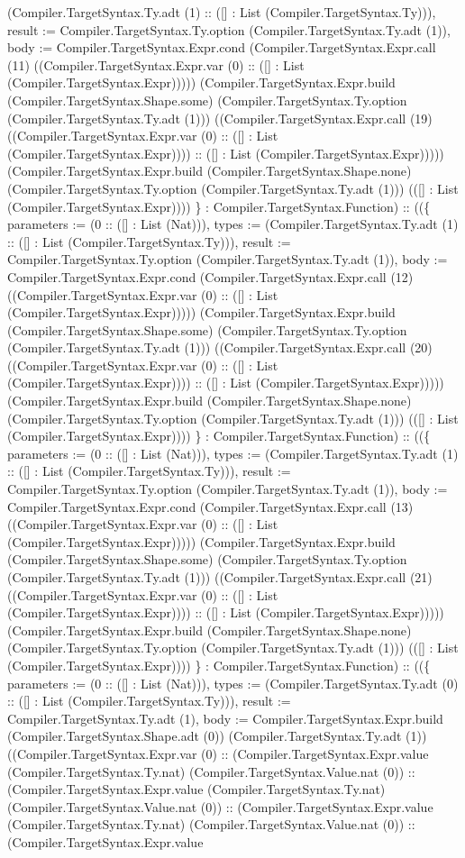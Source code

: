 \documentclass[11pt]{article}
\begin{document}
(Compiler.TargetSyntax.Ty.adt (1) :: ([] : List (Compiler.TargetSyntax.Ty))), result := Compiler.TargetSyntax.Ty.option (Compiler.TargetSyntax.Ty.adt (1)), body := Compiler.TargetSyntax.Expr.cond (Compiler.TargetSyntax.Expr.call (11) ((Compiler.TargetSyntax.Expr.var (0) :: ([] : List (Compiler.TargetSyntax.Expr))))) (Compiler.TargetSyntax.Expr.build (Compiler.TargetSyntax.Shape.some) (Compiler.TargetSyntax.Ty.option (Compiler.TargetSyntax.Ty.adt (1))) ((Compiler.TargetSyntax.Expr.call (19) ((Compiler.TargetSyntax.Expr.var (0) :: ([] : List (Compiler.TargetSyntax.Expr)))) :: ([] : List (Compiler.TargetSyntax.Expr))))) (Compiler.TargetSyntax.Expr.build (Compiler.TargetSyntax.Shape.none) (Compiler.TargetSyntax.Ty.option (Compiler.TargetSyntax.Ty.adt (1))) (([] : List (Compiler.TargetSyntax.Expr)))) \} : Compiler.TargetSyntax.Function) :: ((\{ parameters := (0 :: ([] : List (Nat))), types := (Compiler.TargetSyntax.Ty.adt (1) :: ([] : List (Compiler.TargetSyntax.Ty))), result := Compiler.TargetSyntax.Ty.option (Compiler.TargetSyntax.Ty.adt (1)), body := Compiler.TargetSyntax.Expr.cond (Compiler.TargetSyntax.Expr.call (12) ((Compiler.TargetSyntax.Expr.var (0) :: ([] : List (Compiler.TargetSyntax.Expr))))) (Compiler.TargetSyntax.Expr.build (Compiler.TargetSyntax.Shape.some) (Compiler.TargetSyntax.Ty.option (Compiler.TargetSyntax.Ty.adt (1))) ((Compiler.TargetSyntax.Expr.call (20) ((Compiler.TargetSyntax.Expr.var (0) :: ([] : List (Compiler.TargetSyntax.Expr)))) :: ([] : List (Compiler.TargetSyntax.Expr))))) (Compiler.TargetSyntax.Expr.build (Compiler.TargetSyntax.Shape.none) (Compiler.TargetSyntax.Ty.option (Compiler.TargetSyntax.Ty.adt (1))) (([] : List (Compiler.TargetSyntax.Expr)))) \} : Compiler.TargetSyntax.Function) :: ((\{ parameters := (0 :: ([] : List (Nat))), types := (Compiler.TargetSyntax.Ty.adt (1) :: ([] : List (Compiler.TargetSyntax.Ty))), result := Compiler.TargetSyntax.Ty.option (Compiler.TargetSyntax.Ty.adt (1)), body := Compiler.TargetSyntax.Expr.cond (Compiler.TargetSyntax.Expr.call (13) ((Compiler.TargetSyntax.Expr.var (0) :: ([] : List (Compiler.TargetSyntax.Expr))))) (Compiler.TargetSyntax.Expr.build (Compiler.TargetSyntax.Shape.some) (Compiler.TargetSyntax.Ty.option (Compiler.TargetSyntax.Ty.adt (1))) ((Compiler.TargetSyntax.Expr.call (21) ((Compiler.TargetSyntax.Expr.var (0) :: ([] : List (Compiler.TargetSyntax.Expr)))) :: ([] : List (Compiler.TargetSyntax.Expr))))) (Compiler.TargetSyntax.Expr.build (Compiler.TargetSyntax.Shape.none) (Compiler.TargetSyntax.Ty.option (Compiler.TargetSyntax.Ty.adt (1))) (([] : List (Compiler.TargetSyntax.Expr)))) \} : Compiler.TargetSyntax.Function) :: ((\{ parameters := (0 :: ([] : List (Nat))), types := (Compiler.TargetSyntax.Ty.adt (0) :: ([] : List (Compiler.TargetSyntax.Ty))), result := Compiler.TargetSyntax.Ty.adt (1), body := Compiler.TargetSyntax.Expr.build (Compiler.TargetSyntax.Shape.adt (0)) (Compiler.TargetSyntax.Ty.adt (1)) ((Compiler.TargetSyntax.Expr.var (0) :: (Compiler.TargetSyntax.Expr.value (Compiler.TargetSyntax.Ty.nat) (Compiler.TargetSyntax.Value.nat (0)) :: (Compiler.TargetSyntax.Expr.value (Compiler.TargetSyntax.Ty.nat) (Compiler.TargetSyntax.Value.nat (0)) :: (Compiler.TargetSyntax.Expr.value (Compiler.TargetSyntax.Ty.nat) (Compiler.TargetSyntax.Value.nat (0)) :: (Compiler.TargetSyntax.Expr.value 
\end{document}
